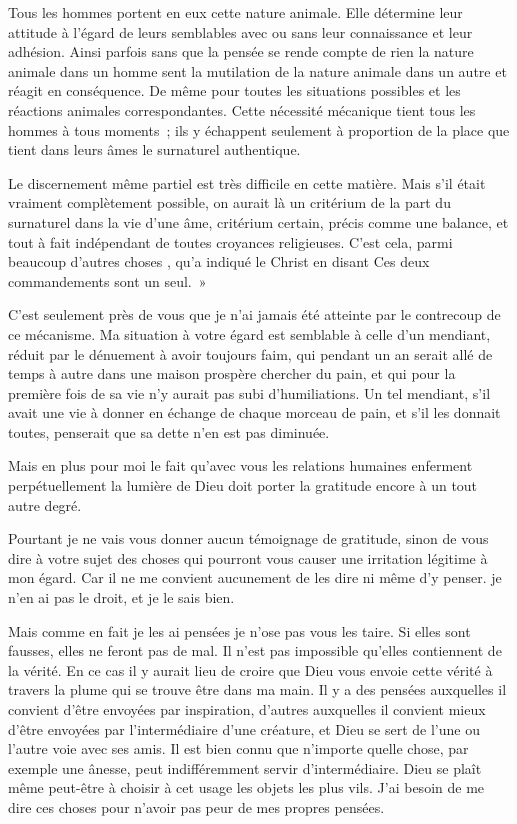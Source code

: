 \documentclass[french,twoside]{book} %
\begin{document}
Tous les hommes portent en eux cette nature animale. Elle détermine leur attitude à l'égard de leurs semblables avec ou sans leur connaissance et leur adhésion. Ainsi parfois sans que la pensée se rende compte de rien la nature animale dans un homme sent la mutilation de la nature animale dans un autre et réagit en conséquence. De même pour toutes les situations possibles et les réactions animales correspondantes. Cette nécessité mécanique tient tous les hommes à tous moments ; ils y échappent seulement à proportion de la place que tient dans leurs âmes le surnaturel authentique.\par
Le discernement même partiel est très difficile en cette matière. Mais s'il était vraiment complètement possible, on aurait là un critérium de la part du surnaturel dans la vie d'une âme, critérium certain, précis comme une balance, et tout à fait indépendant de toutes croyances religieuses. C'est cela, parmi beaucoup d'autres choses , qu'a indiqué le Christ en disant Ces deux commandements sont un seul. »\par
C'est seulement près de vous que je n'ai jamais été atteinte par le contrecoup de ce mécanisme. Ma situation à votre égard est semblable à celle d'un mendiant, réduit par le dénuement à avoir toujours faim, qui pendant un an serait allé de temps à autre dans une maison prospère chercher du pain, et qui pour la première fois de sa vie n'y aurait pas subi d'humiliations. Un tel mendiant, s'il avait une vie à donner en échange de chaque morceau de pain, et s'il les donnait toutes, penserait que sa dette n'en est pas diminuée.\par
Mais en plus pour moi le fait qu'avec vous les relations humaines enferment perpétuellement la lumière de Dieu doit porter la gratitude encore à un tout autre degré.\par
Pourtant je ne vais vous donner aucun témoignage de gratitude, sinon de vous dire à votre sujet des choses qui pourront vous causer une irritation légitime à mon égard. Car il ne me convient aucunement de les dire ni même d'y penser. je n'en ai pas le droit, et je le sais bien.\par
Mais comme en fait je les ai pensées je n'ose pas vous les taire. Si elles sont fausses, elles ne feront pas de mal. Il n'est pas impossible qu'elles contiennent de la vérité. En ce cas il y aurait lieu de croire que Dieu vous envoie cette vérité à travers la plume qui se trouve être dans ma main. Il y a des pensées auxquelles il convient d'être envoyées par inspiration, d'autres auxquelles il convient mieux d'être envoyées par l'intermédiaire d'une créature, et Dieu se sert de l'une ou l'autre voie avec ses amis. Il est bien connu que n'importe quelle chose, par exemple une ânesse, peut indifféremment servir d'intermédiaire. Dieu se plaît même peut-être à choisir à cet usage les objets les plus vils. J'ai besoin de me dire ces choses pour n'avoir pas peur de mes propres pensées.\par
\end{document}
